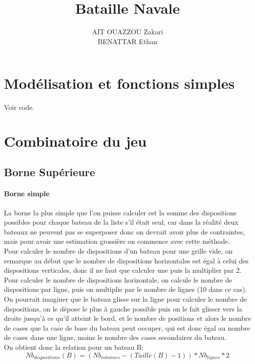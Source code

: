 \documentclass[12pt]{article}
\begin{document}
 
 
\title{Bataille Navale}%
\author{AIT OUAZZOU Zakari\\ %
BENATTAR Ethan} %
 
\maketitle

\section{Modélisation et fonctions simples}
    \paragraph{}
        Voir code.
\section{Combinatoire du jeu}
    \subsection{Borne Supérieure}
        \paragraph{Borne simple}
            La borne la plus simple que l'on puisse calculer est la somme des dispositions possibles pour chaque bateau de la liste s'il était seul, car dans la réalité deux bateaux ne peuvent pas se superposer donc on devrait avoir plus de contraintes, mais pour avoir une estimation grossière on commence avec cette méthode. \\
            Pour calculer le nombre de dispositions d'un bateau pour une grille vide, on remarque au début que le nombre de dispositions horizontales est égal à celui des dispositions verticales, donc il ne faut que calculer une puis la multiplier par 2. \\
            Pour calculer le nombre de dispositions horizontale, on calcule le nombre de dispositions par ligne, puis on multiplie par le nombre de lignes (10 dans ce cas).
            On pourrait imaginer que le bateau glisse sur la ligne pour calculer le nombre de dispositions, on le dépose le plus à gauche possible puis on le fait glisser vers la droite jusqu'à ce qu'il atteint le bord, et le nombre de positions et alors le nombre de cases que la case de base du bateau peut occuper, qui est donc égal au nombre de cases dans une ligne, moins le nombre des cases secondaires du bateau.\\
            On obtient donc la relation pour un bateau B: $$Nb_{dispositions}(B) = (Nb_{colonnes}-(Taille(B)-1))*Nb_{lignes}*2$$
            
\end{document}
